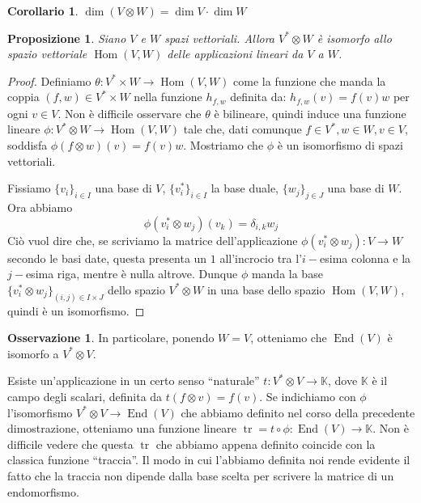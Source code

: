 \documentclass[11pt]{article}
\theoremstyle{plain}
\newtheorem{prop}[thm]{Proposizione}
\newtheorem*{cor}{Corollario}
\theoremstyle{definition}
\newtheorem*{rem}{Osservazione}
\theoremstyle{remark}
\newcommand{\K}{\mathbb{K}}
\DeclareMathOperator{\tr}{tr}
\DeclareMathOperator{\Hom}{Hom}
\DeclareMathOperator{\End}{End}
\begin{document}
\begin{cor}
$\dim(V \otimes W) = \dim V \cdot \dim W$
\end{cor}


\begin{prop}
Siano $V$ e $W$ spazi vettoriali. Allora $V^*\otimes W$ è isomorfo allo spazio vettoriale $\Hom(V,W)$ delle applicazioni lineari da $V$ a $W$.
\end{prop}
\begin{proof}
Definiamo $\theta: V^*\times W \to \Hom(V,W)$ come la funzione che manda la coppia $(f, w)\in V^*\times W$ nella funzione  $h_{f,w}$ definita da:
$h_{f,w}(v) = f(v)w$ per ogni $v\in V$. Non è difficile osservare che $\theta$ è bilineare, quindi induce una funzione lineare
$\phi : V^*\otimes W \to \Hom(V,W)$ tale che, dati comunque $f\in V^*, w\in W, v\in V$, soddisfa $\phi(f\otimes w)(v) = f(v)w$.
Mostriamo che $\phi$ è un isomorfismo di spazi vettoriali.

Fissiamo $\{v_i\}_{i\in I}$ una base di $V$, $\{v_i^*\}_{i\in I}$ la base duale, $\{w_j\}_{j\in J}$ una base di $W$.
Ora abbiamo 
\[\phi(v_i^*\otimes w_j)(v_k) = \delta_{i,k} w_j\]
Ciò vuol dire che, se scriviamo la matrice dell'applicazione $\phi(v_i^*\otimes w_j):V\to W$ secondo le basi date, questa presenta un $1$ all'incrocio
tra l'$i-$esima colonna e la $j-$esima riga, mentre è nulla altrove.
Dunque $\phi$ manda la base $\{v_i^*\otimes w_j\}_{(i,j)\in I\times J}$ dello spazio $V^*\otimes W$ in una base dello spazio $\Hom(V,W)$,
quindi è un isomorfismo.
\end{proof}

\begin{rem}
In particolare, ponendo $W=V$, otteniamo che $\End(V)$ è isomorfo a $V^*\otimes V$.

Esiste un'applicazione in un certo senso ``naturale'' $t:V^*\otimes V \to \K$, dove $\K$ è il campo degli scalari, definita da
$t(f\otimes v) = f(v)$.
Se indichiamo con $\phi$ l'isomorfismo $V^*\otimes V\to \End(V)$ che abbiamo definito nel corso della precedente dimostrazione,
otteniamo una funzione lineare $\tr = t\circ \phi: \End(V)\to \K$. Non è difficile vedere che questa $\tr$ che abbiamo appena definito 
coincide con la classica funzione ``traccia''. Il modo in cui l'abbiamo definita noi rende evidente il fatto che la traccia non dipende
dalla base scelta per scrivere la matrice di un endomorfismo.
\end{rem}
\end{document}
